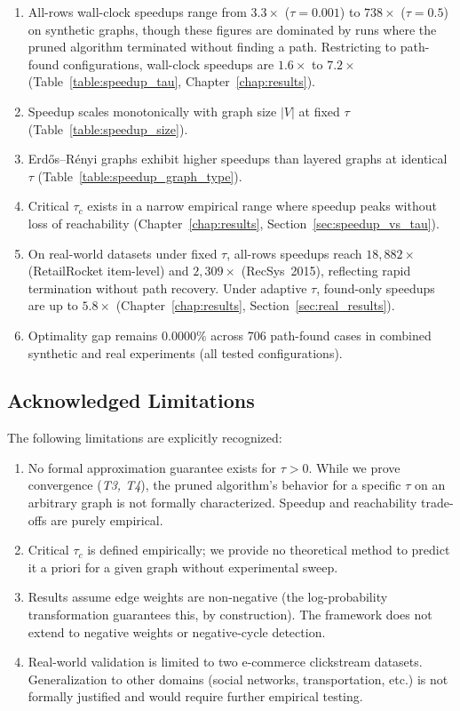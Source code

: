 \begin{enumerate}
\item[(E1)] All-rows wall-clock speedups range from $3.3\times$ ($\tau=0.001$) to $738\times$ ($\tau=0.5$) on synthetic graphs, though these figures are dominated by runs where the pruned algorithm terminated without finding a path. Restricting to path-found configurations, wall-clock speedups are $1.6\times$ to $7.2\times$ (Table~\ref{table:speedup_tau}, Chapter~\ref{chap:results}).
\item[(E2)] Speedup scales monotonically with graph size $|V|$ at fixed $\tau$ (Table~\ref{table:speedup_size}).
\item[(E3)] Erd\H{o}s--R\'{e}nyi graphs exhibit higher speedups than layered graphs at identical $\tau$ (Table~\ref{table:speedup_graph_type}).
\item[(E4)] Critical $\tau_c$ exists in a narrow empirical range where speedup peaks without loss of reachability (Chapter~\ref{chap:results}, Section~\ref{sec:speedup_vs_tau}).
\item[(E5)] On real-world datasets under fixed $\tau$, all-rows speedups reach $18{,}882\times$ (RetailRocket item-level) and $2{,}309\times$ (RecSys~2015), reflecting rapid termination without path recovery. Under adaptive $\tau$, found-only speedups are up to $5.8\times$ (Chapter~\ref{chap:results}, Section~\ref{sec:real_results}).
\item[(E6)] Optimality gap remains $0.0000\%$ across 706 path-found cases in combined synthetic and real experiments (all tested configurations).
\end{enumerate}

\subsection{Acknowledged Limitations}

The following limitations are explicitly recognized:

\begin{enumerate}
\item[(L1)] No formal approximation guarantee exists for $\tau > 0$. While we prove convergence (\textit{T3, T4}), the pruned algorithm's behavior for a specific $\tau$ on an arbitrary graph is not formally characterized. Speedup and reachability trade-offs are purely empirical.
\item[(L2)] Critical $\tau_c$ is defined empirically; we provide no theoretical method to predict it a priori for a given graph without experimental sweep.
\item[(L3)] Results assume edge weights are non-negative (the log-probability transformation guarantees this, by construction). The framework does not extend to negative weights or negative-cycle detection.
\item[(L4)] Real-world validation is limited to two e-commerce clickstream datasets. Generalization to other domains (social networks, transportation, etc.) is not formally justified and would require further empirical testing.
\end{enumerate}
